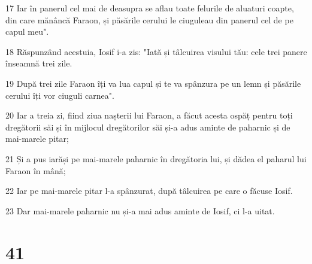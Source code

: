 \par 17 Iar în panerul cel mai de deasupra se aflau toate felurile de aluaturi coapte, din care mănâncă Faraon, și păsările cerului le ciuguleau din panerul cel de pe capul meu".
\par 18 Răspunzând acestuia, Iosif i-a zis: "Iată și tâlcuirea visului tău: cele trei panere înseamnă trei zile.
\par 19 După trei zile Faraon îți va lua capul și te va spânzura pe un lemn și păsările cerului îți vor ciuguli carnea".
\par 20 Iar a treia zi, fiind ziua nașterii lui Faraon, a făcut acesta ospăț pentru toți dregătorii săi și în mijlocul dregătorilor săi și-a adus aminte de paharnic și de mai-marele pitar;
\par 21 Și a pus iarăși pe mai-marele paharnic în dregătoria lui, și dădea el paharul lui Faraon în mână;
\par 22 Iar pe mai-marele pitar l-a spânzurat, după tâlcuirea pe care o făcuse Iosif.
\par 23 Dar mai-marele paharnic nu și-a mai adus aminte de Iosif, ci l-a uitat.

\chapter{41}

